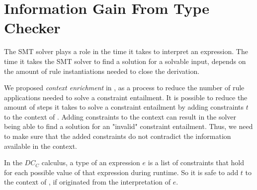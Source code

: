 \section{Information Gain From Type Checker}
The SMT solver plays a role in the time it takes
to interpret an expression.
The time it takes the SMT solver to find a
solution for a solvable input, depends on the amount
of rule instantiations needed to close the derivation.

We proposed \textit{context enrichment} in ,
as a process to reduce the number of rule applications needed
to solve a constraint entailment.
It is possible to reduce the amount of steps it takes
to solve a constraint entailment 
by adding constraints $t$ to the context of .
Adding constraints to the context
can result in the solver being able to find a solution for
an "invalid" constraint entailment.
Thus, we need to make sure that the added constraints
do not contradict the information available in the context.

In the $DC_C$ calculus, a type of an expression $e$ is a list of constraints that
hold for each possible value of that expression during runtime.
So it is safe to add $t$ to the context of ,
if  originated from the interpretation of $e$.
%

